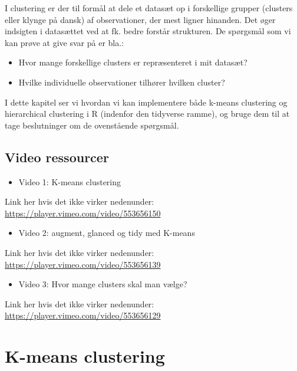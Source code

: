 \documentclass[
]{book}
\providecommand{\tightlist}{%
  \setlength{\itemsep}{0pt}\setlength{\parskip}{0pt}}
\begin{document}
I clustering er der til formål at dele et datasæt op i forskellige grupper (clusters eller klynge på dansk) af observationer, der mest ligner hinanden. Det øger indsigten i datasættet ved at fk. bedre forstår strukturen. De spørgsmål som vi kan prøve at give svar på er bla.:

\begin{itemize}
\tightlist
\item
  Hvor mange forskellige clusters er repræsenteret i mit datasæt?
\item
  Hvilke individuelle observationer tilhører hvilken cluster?
\end{itemize}

I dette kapitel ser vi hvordan vi kan implementere både k-means clustering og hierarchical clustering i R (indenfor den tidyverse ramme), og bruge dem til at tage beslutninger om de ovenstående spørgsmål.

\hypertarget{video-ressourcer-5}{%
\subsection{Video ressourcer}\label{video-ressourcer-5}}

\begin{itemize}
\tightlist
\item
  Video 1: K-means clustering
\end{itemize}

Link her hvis det ikke virker nedenunder: \url{https://player.vimeo.com/video/553656150}

\begin{itemize}
\tightlist
\item
  Video 2: augment, glanced og tidy med K-means
\end{itemize}

Link her hvis det ikke virker nedenunder: \url{https://player.vimeo.com/video/553656139}

\begin{itemize}
\tightlist
\item
  Video 3: Hvor mange clusters skal man vælge?
\end{itemize}

Link her hvis det ikke virker nedenunder: \url{https://player.vimeo.com/video/553656129}

\hypertarget{k-means-clustering}{%
\section{K-means clustering}\label{k-means-clustering}}
\end{document}
